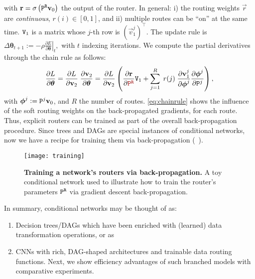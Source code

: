 \documentclass[thesis]{subfiles}
\begin{document}
	with $\vec r= \sigma \left( \mat P^{\tt R} \vec v_0 \right)$ the output of the router.
	In general: 
	i) the routing weights $\vec r$ are {\em continuous}, $r(i)\in[0,1]$, and
	ii) multiple routes can be ``on'' at the same time.
	$\mat V_1$ is a matrix whose $j$-th row is $(\vec v_1^j) ^\top$.
	The update rule is
	$
	\Delta \boldsymbol\theta_{t+1}  := -\rho \left. \frac{\partial E}{\partial \boldsymbol\theta} \right|_t,
	$ with $t$ indexing iterations. We compute the partial derivatives through the chain rule as follows:
	\begin{equation}
	\frac{\partial L}{\partial \boldsymbol\theta} = 
	\frac{\partial L}{\partial \vec v_2} \; 
	\frac{\partial \vec v_2}{\partial \boldsymbol\theta} = 
	\frac{\partial L}{\partial \vec v_2} \left( 
	\frac{\partial \vec r}{\partial \textcolor{myred}{\mat P^{\tt R}}} \mat V_1 +  
	\sum_{j=1}^{R} \;r(j)\; 
	\frac{\partial \vec v_1^j}{\partial \boldsymbol\phi^j} 
	\frac{\partial \boldsymbol\phi^j}{\partial \mat P^j}\right)
	\label{eq:chainrule},
	\end{equation}
	with $\boldsymbol{\phi}^j := \mat P^j \vec v_0$, and $R$ the number of routes. 
	\cref{eq:chainrule} shows the influence of the soft routing weights on the 
	back-propagated gradients, for each route.
	Thus, explicit routers can be trained as part of the overall back-propagation procedure. 
	Since trees and DAGs are special instances of conditional networks, 
	now we have a recipe for training them via back-propagation (\cf~\cite{Kontschieder2015,Schulter2013Alternating,Suarez1999GlobalTree}).
	
	
	\begin{figure}[tbp]
	\centerline{
	\texttt{[image: training]}
	}
	   \caption[Training a network's routers via back-propagation]{{\bf Training a network's routers via back-propagation.} 
	   A toy conditional network used to illustrate how to train the router's parameters $\mat P^{\tt R}$ via gradient descent back-propagation.}
	\label{fig:training}
	\end{figure}
	
	In summary, conditional networks may be thought of as:
	\begin{enumerate}
	\item Decision trees/DAGs which have been enriched with (learned) data transformation operations, or as
	\item CNNs with rich, DAG-shaped architectures and trainable data routing functions. 
	Next, we show efficiency advantages of such branched models with comparative experiments.
	\end{enumerate}
	
\end{document}
